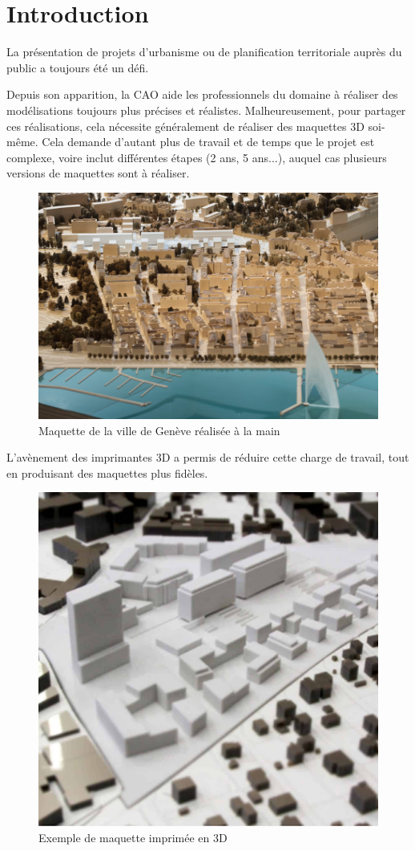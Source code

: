\chapter{Introduction}

\label{Chapter1} %

La présentation de projets d'urbanisme ou de planification territoriale auprès du public a toujours été un défi. 




Depuis son apparition, la CAO aide les professionnels du domaine à réaliser des modélisations toujours plus précises et réalistes. 
Malheureusement, pour partager ces réalisations, cela nécessite généralement de réaliser des maquettes 3D soi-même. Cela demande d'autant plus de travail et de temps que le projet est complexe, voire inclut différentes étapes (2 ans, 5 ans...), auquel cas plusieurs versions de maquettes sont à réaliser.

\begin{figure}[h]
    \centering
    \includegraphics[width=0.8\linewidth]{Figures/geneva-model.png}
    \caption{Maquette de la ville de Genève réalisée à la main}
    \label{fig:3dprinted-model}
\end{figure}

L'avènement des imprimantes 3D a permis de réduire cette charge de travail, tout en produisant des maquettes plus fidèles. 


\begin{figure}[h]
    \centering
    \includegraphics[width=0.5\linewidth]{Figures/3dprinted-model.jpg}
    \caption{Exemple de maquette imprimée en 3D}
    \label{fig:3dprinted-model}
\end{figure}


